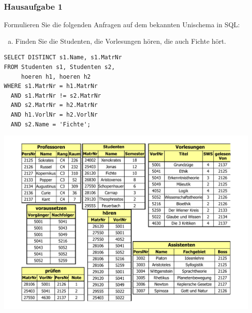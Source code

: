\begin{frame}[fragile]
	\frametitle{Hausaufgabe 1}
	\vspace{0.25cm}

	\begin{multicols}{2}
		Formulieren Sie die folgenden Anfragen auf dem bekannten Unischema in SQL:
		\begin{enumerate}[b)]
			\item Finden Sie die Studenten, die Vorlesungen hören, die auch Fichte hört.
		\end{enumerate}

		\begin{verbatim}
SELECT DISTINCT s1.Name, s1.MatrNr
FROM Studenten s1, Studenten s2, 
	 hoeren h1, hoeren h2
WHERE s1.MatrNr = h1.MatrNr
  AND s1.MatrNr != s2.MatrNr
  AND s2.MatrNr = h2.MatrNr
  AND h1.VorlNr = h2.VorlNr
  AND s2.Name = 'Fichte';
		\end{verbatim}
		\vfill\columnbreak

		\begin{center}
			\includegraphics[height=.6\paperheight]{../img/uni.pdf}
		\end{center}
	\end{multicols}
\end{frame}

